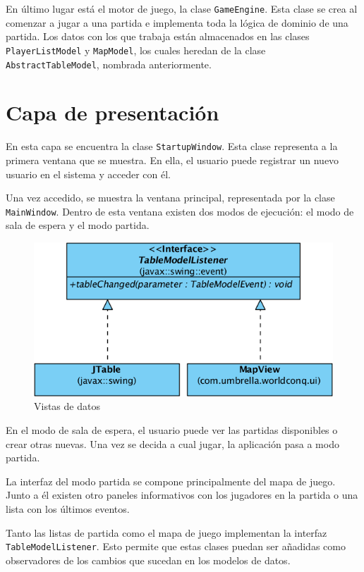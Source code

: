 En último lugar está el motor de juego, la clase \texttt{GameEngine}. Esta
clase se crea al comenzar a jugar a una partida e implementa toda la lógica de
dominio de una partida. Los datos con los que trabaja están almacenados en las
clases \texttt{PlayerListModel} y \texttt{MapModel}, los cuales heredan de la
clase \texttt{AbstractTableModel}, nombrada anteriormente.

\section{Capa de presentación}

En esta capa se encuentra la clase \texttt{StartupWindow}. Esta clase
representa a la primera ventana que se muestra. En ella, el usuario puede
registrar un nuevo usuario en el sistema y acceder con él.

Una vez accedido, se muestra la ventana principal, representada por la clase
\texttt{MainWindow}. Dentro de esta ventana existen dos modos de ejecución: el
modo de sala de espera y el modo partida.

\begin{figure}[h]
\caption{Vistas de datos}
\centering
\includegraphics[scale=0.4]{img/ch02arch-views.png}
\end{figure}

En el modo de sala de espera, el usuario puede ver las partidas disponibles o
crear otras nuevas. Una vez se decida a cual jugar, la aplicación pasa a modo
partida.

La interfaz del modo partida se compone principalmente del mapa de juego. Junto
a él existen otro paneles informativos con los jugadores en la partida o una
lista con los últimos eventos.

Tanto las listas de partida como el mapa de juego implementan la interfaz
\texttt{TableModelListener}. Esto permite que estas clases puedan ser añadidas
como observadores de los cambios que sucedan en los modelos de datos.
